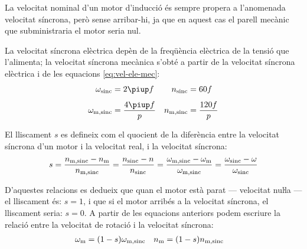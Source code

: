 La velocitat nominal d'un motor d'inducció és sempre propera a l'anomenada velocitat síncrona, però sense arribar-hi, ja que en aquest cas el parell mecànic que subministraria el motor seria nul.

La velocitat síncrona elèctrica depèn de la freqüència elèctrica de la tensió que l'alimenta; la velocitat síncrona mecànica s'obté a partir de la velocitat síncrona elèctrica i de  les equacions \eqref{eq:vel-ele-mec}:
\begin{subequations}\index{motors d'inducció!velocitat síncrona}
\begin{align}
    \omega\ped{sinc} &= 2 \piup f & n\ped{sinc} &= 60 f \\[1ex]
    \omega\ped{m,sinc} &= \frac{4 \piup f}{p} & n\ped{m,sinc} &= \frac{120 f}{p}\label{eq:vel-mec-sinc}
\end{align}
\end{subequations}

El lliscament $s$ es defineix com el quocient de la diferència entre la velocitat síncrona d'un motor i la velocitat real, i la velocitat síncrona:
\begin{equation}\label{eq:lliscament}\index{lliscament}
    s = \frac{n\ped{m,sinc}-n\ped{m}}{n\ped{m,sinc}} =
    \frac{n\ped{sinc}-n}{n\ped{sinc}} =
    \frac{\omega\ped{m,sinc}-\omega\ped{m}}{\omega\ped{m,sinc}} =
    \frac{\omega\ped{sinc}-\omega}{\omega\ped{sinc}}
\end{equation}

D'aquestes relacions es dedueix que quan el motor està parat --- velocitat nuŀla --- el lliscament és: $s=1$, i que si el motor arribés a la velocitat síncrona, el lliscament seria: $s=0$. A partir de les equacions anteriors podem escriure la relació entre la velocitat de rotació i la velocitat síncrona:
\begin{align}
    \omega_\mathrm{m} &= (1-s) \omega_\mathrm{m,sinc} & n_\mathrm{m} &= (1-s) n_\mathrm{m,sinc} \label{eq:wm-wsinc}
\end{align}


